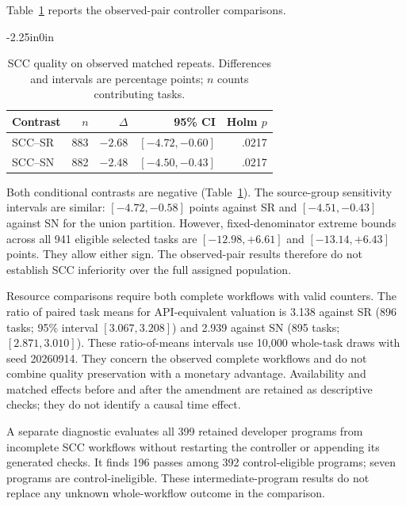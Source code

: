 \documentclass[10pt,letterpaper]{article}
\begin{document}
Table~\ref{tab:scc-quality} reports the observed-pair controller comparisons.

\FloatBarrier
\begin{table}[!ht]
\begin{adjustwidth}{-2.25in}{0in}
\caption{SCC quality on observed matched repeats. Differences and intervals are percentage points; $n$ counts contributing tasks.}
\label{tab:scc-quality}
\centering\small
\begin{tabular}{@{}lrrrr@{}}
\toprule
Contrast & $n$ & $\Delta$ & 95\% CI & Holm $p$\\
\midrule
SCC--SR & 883 & $-2.68$ & $[-4.72,-0.60]$ & .0217\\
SCC--SN & 882 & $-2.48$ & $[-4.50,-0.43]$ & .0217\\
\bottomrule
\end{tabular}
\end{adjustwidth}
\end{table}
\FloatBarrier

Both conditional contrasts are negative (Table~\ref{tab:scc-quality}). The source-group sensitivity intervals are similar: $[-4.72,-0.58]$ points against SR and $[-4.51,-0.43]$ against SN for the union partition. However, fixed-denominator extreme bounds across all 941 eligible selected tasks are $[-12.98,+6.61]$ and $[-13.14,+6.43]$ points. They allow either sign. The observed-pair results therefore do not establish SCC inferiority over the full assigned population.

Resource comparisons require both complete workflows with valid counters. The ratio of paired task means for API-equivalent valuation is 3.138 against SR (896 tasks; 95\% interval $[3.067,3.208]$) and 2.939 against SN (895 tasks; $[2.871,3.010]$). These ratio-of-means intervals use 10,000 whole-task draws with seed 20260914. They concern the observed complete workflows and do not combine quality preservation with a monetary advantage. Availability and matched effects before and after the amendment are retained as descriptive checks; they do not identify a causal time effect.

A separate diagnostic evaluates all 399 retained developer programs from incomplete SCC workflows without restarting the controller or appending its generated checks. It finds 196 passes among 392 control-eligible programs; seven programs are control-ineligible. These intermediate-program results do not replace any unknown whole-workflow outcome in the comparison.
\end{document}
